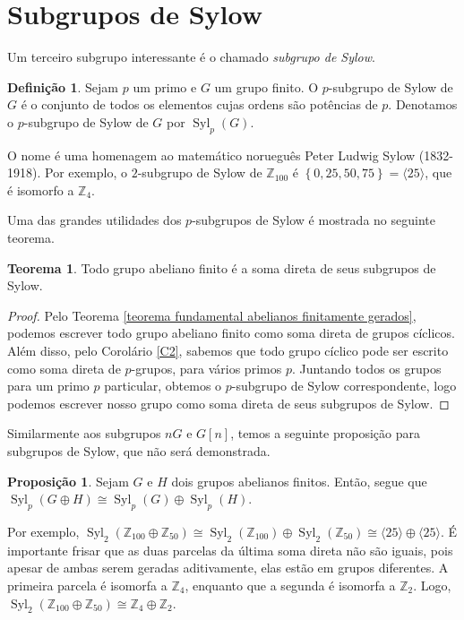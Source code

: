 \documentclass[a4paper,portuguese,11pt,twoside, leqno]{book}
\DeclareMathOperator{\syl}{Syl}
\theoremstyle{definition}
\newtheorem{theorem}{Teorema}[section]
\newtheorem*{definition}{Definição}
\newtheorem{prop}{Proposição}[section]
\begin{document}
	\section{Subgrupos de Sylow} Um terceiro subgrupo interessante é o chamado \textit{subgrupo de Sylow}.
	\begin{definition}
		\label{def subgrupo de Sylow}
		Sejam $p$ um primo e $G$ um grupo finito. O $p$-subgrupo de Sylow de $G$ é o conjunto de todos os elementos cujas ordens são potências de $p$. Denotamos o $p$-subgrupo de Sylow de $G$ por $\syl_p(G)$.
	\end{definition}
	\par\vspace{0.3cm} O nome é uma homenagem ao matemático norueguês Peter Ludwig Sylow (1832-1918). Por exemplo, o $2$-subgrupo de Sylow de $\mathbb{Z}_{100}$	é $\left\{ 0, 25, 50, 75 \right\} = \langle 25 \rangle$, que é isomorfo a $\mathbb{Z}_4$.
	\par\vspace{0.3cm} Uma das grandes utilidades dos $p$-subgrupos de Sylow é mostrada no seguinte teorema.
	\begin{theorem}
		\label{subgrupos de Sylow e abelianos}
		Todo grupo abeliano finito é a soma direta de seus subgrupos de Sylow.
	\end{theorem}
	\begin{proof}
		Pelo Teorema \eqref{teorema fundamental abelianos finitamente gerados}, podemos escrever todo grupo abeliano finito como soma direta de grupos cíclicos. Além disso, pelo Corolário \eqref{C2}, sabemos que todo grupo cíclico pode ser escrito como soma direta de $p$-grupos, para vários primos $p$. Juntando todos os grupos para um primo $p$ particular, obtemos o $p$-subgrupo de Sylow correspondente, logo podemos escrever nosso grupo como soma direta de seus subgrupos de Sylow.
	\end{proof}
	\par\vspace{0.3cm} Similarmente aos subgrupos $nG$ e $G[n]$, temos a seguinte proposição para subgrupos de Sylow, que não será demonstrada.
	\begin{prop}
		\label{Sylow da soma direta}
		Sejam $G$ e $H$ dois grupos abelianos finitos. Então, segue que  $\syl_p(G\oplus H)\cong \syl_p(G)\oplus\syl_p(H)$.
	\end{prop}
	\par\vspace{0.3cm} Por exemplo, $\syl_2(\mathbb{Z}_{100}\oplus\mathbb{Z}_{50}) \cong \syl_2(\mathbb{Z}_{100})\oplus\syl_2(\mathbb{Z}_{50})\cong \langle 25 \rangle \oplus \langle 25 \rangle$. É importante frisar que as duas parcelas da última soma direta não são iguais, pois apesar de ambas serem geradas aditivamente, elas estão em grupos diferentes. A primeira parcela é isomorfa a $\mathbb{Z}_4$, enquanto que a segunda é isomorfa a $\mathbb{Z}_2$. Logo, $\syl_2(\mathbb{Z}_{100}\oplus\mathbb{Z}_{50})\cong\mathbb{Z}_4\oplus\mathbb{Z}_2$.
\end{document}
